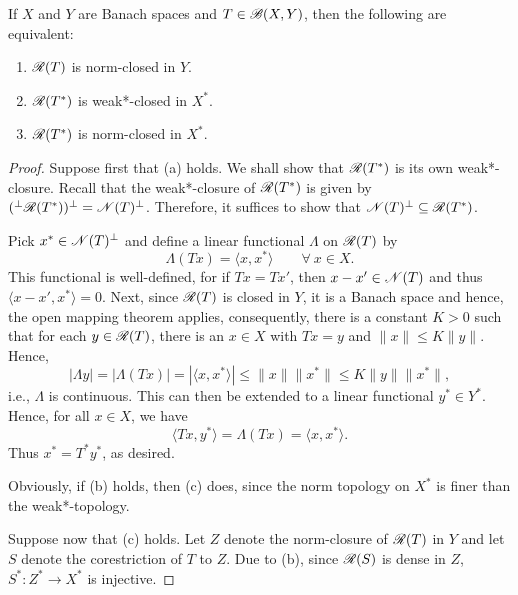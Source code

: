 \begin{theorem}
    If $X$ and $Y$ are Banach spaces and $T\in\mathscr B(X, Y)$, then the following are equivalent: 
    \begin{enumerate}[label=(\alph*)]
        \item $\mathscr R(T)$ is norm-closed in $Y$. 
        \item $\mathscr R(T^\ast)$ is weak*-closed in $X^\ast$.
        \item $\mathscr R(T^\ast)$ is norm-closed in $X^\ast$.
    \end{enumerate}
\end{theorem}
\begin{proof}
    Suppose first that (a) holds. We shall show that $\mathscr R(T^\ast)$ is its own weak*-closure. Recall that the weak*-closure of $\mathscr R(T^\ast)$ is given by $({}^\perp\mathscr R(T^\ast))^\perp = \mathscr N(T)^\perp$. Therefore, it suffices to show that $\mathscr N(T)^\perp\subseteq\mathscr R(T^\ast)$. 

    Pick $x^\ast\in\mathscr N(T)^\perp$ and define a linear functional $\Lambda$ on $\mathscr R(T)$ by 
    \begin{equation*}
        \Lambda(Tx) = \langle x, x^\ast\rangle\qquad\forall~x\in X.
    \end{equation*}
    This functional is well-defined, for if $Tx = Tx'$, then $x - x'\in\mathscr N(T)$ and thus $\langle x - x', x^\ast\rangle = 0$. Next, since $\mathscr R(T)$ is closed in $Y$, it is a Banach space and hence, the open mapping theorem applies, consequently, there is a constant $K > 0$ such that for each $y\in\mathscr R(T)$, there is an $x\in X$ with $Tx = y$ and $\|x\|\le K\|y\|$. Hence, 
    \begin{equation*}
        |\Lambda y| = |\Lambda(Tx)| = |\langle x,x^\ast\rangle|\le \|x\|\|x^\ast\|\le K\|y\|\|x^\ast\|,
    \end{equation*}
    i.e., $\Lambda$ is continuous. This can then be extended to a linear functional $y^\ast\in Y^\ast$. Hence, for all $x\in X$, we have 
    \begin{equation*}
        \langle Tx, y^\ast\rangle = \Lambda(Tx) = \langle x, x^\ast\rangle.
    \end{equation*}
    Thus $x^\ast = T^\ast y^\ast$, as desired.

    Obviously, if (b) holds, then (c) does, since the norm topology on $X^\ast$ is finer than the weak*-topology.

    Suppose now that (c) holds. Let $Z$ denote the norm-closure of $\mathscr R(T)$ in $Y$ and let $S$ denote the corestriction of $T$ to $Z$. Due to  (b), since $\mathscr R(S)$ is dense in $Z$, $S^\ast: Z^\ast\to X^\ast$ is injective.


\end{proof}
